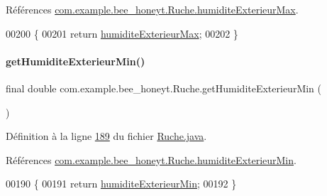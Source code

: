 Références \hyperlink{_ruche_8java_source_l00032}{com.\+example.\+bee\+\_\+honeyt.\+Ruche.\+humidite\+Exterieur\+Max}.


\begin{DoxyCode}
00200     \{
00201         \textcolor{keywordflow}{return} \hyperlink{classcom_1_1example_1_1bee__honeyt_1_1_ruche_a76e636b4d5e0a18b187905e0d6d73a71}{humiditeExterieurMax};
00202     \}
\end{DoxyCode}
\mbox{\label{classcom_1_1example_1_1bee__honeyt_1_1_ruche_a53c9d56abd4eed6f2f2d413e78ab0aba}} 
\paragraph{\texorpdfstring{get\+Humidite\+Exterieur\+Min()}{getHumiditeExterieurMin()}}
{\footnotesize\ttfamily final double com.\+example.\+bee\+\_\+honeyt.\+Ruche.\+get\+Humidite\+Exterieur\+Min (\begin{DoxyParamCaption}{ }\end{DoxyParamCaption})}



Définition à la ligne \hyperlink{_ruche_8java_source_l00189}{189} du fichier \hyperlink{_ruche_8java_source}{Ruche.\+java}.



Références \hyperlink{_ruche_8java_source_l00031}{com.\+example.\+bee\+\_\+honeyt.\+Ruche.\+humidite\+Exterieur\+Min}.


\begin{DoxyCode}
00190     \{
00191         \textcolor{keywordflow}{return} \hyperlink{classcom_1_1example_1_1bee__honeyt_1_1_ruche_ad58b8815412827add256f6c6e11d3043}{humiditeExterieurMin};
00192     \}
\end{DoxyCode}
\mbox{\label{classcom_1_1example_1_1bee__honeyt_1_1_ruche_a80f34bd8fdc880a8f94d9d61b6b70c78}} 
